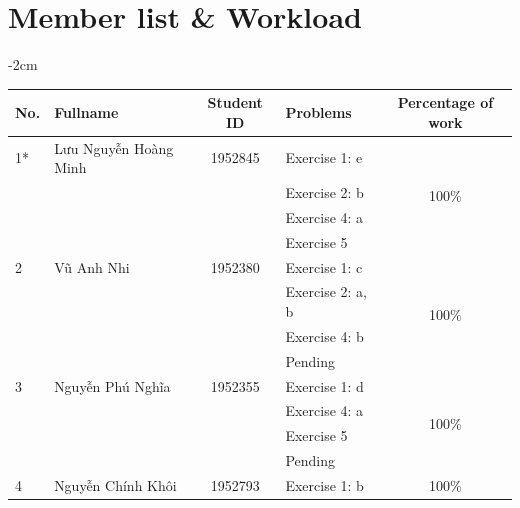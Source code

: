 \documentclass[a4paper]{article}
\numberwithin{equation}{section}
\begin{document}
\section*{Member list \& Workload}
\begin{center}
  \addtolength{\leftskip} {-2cm}
  \addtolength{\rightskip}{-2cm}
  \begin{tabular}{llclc}
    \toprule
    \textbf{No.} & \textbf{Fullname}     & \textbf{Student ID} & \textbf{Problems} & \textbf{Percentage of work} \\
    \midrule
    1*           & Lưu Nguyễn Hoàng Minh & 1952845             & Exercise 1: e     & \multirow{4}{*}{100\%}      \\
                 &                       &                     & Exercise 2: b     &                             \\
                 &                       &                     & Exercise 4: a     &                             \\
                 &                       &                     & Exercise 5        &                             \\
    \midrule
    2            & Vũ Anh Nhi            & 1952380             & Exercise 1: c     & \multirow{4}{*}{100\%}      \\
                 &                       &                     & Exercise 2: a, b  &                             \\
                 &                       &                     & Exercise 4: b     &                             \\
                 &                       &                     & Pending           &                             \\
    \midrule
    3            & Nguyễn Phú Nghĩa      & 1952355             & Exercise 1: d     & \multirow{4}{*}{100\%}      \\
                 &                       &                     & Exercise 4: a     &                             \\
                 &                       &                     & Exercise 5        &                             \\
                 &                       &                     & Pending           &                             \\
    \midrule
    4            & Nguyễn Chính Khôi     & 1952793             & Exercise 1: b     & \multirow{4}{*}{100\%}      \\

\end{tabular}
\end{center}
\end{document}
